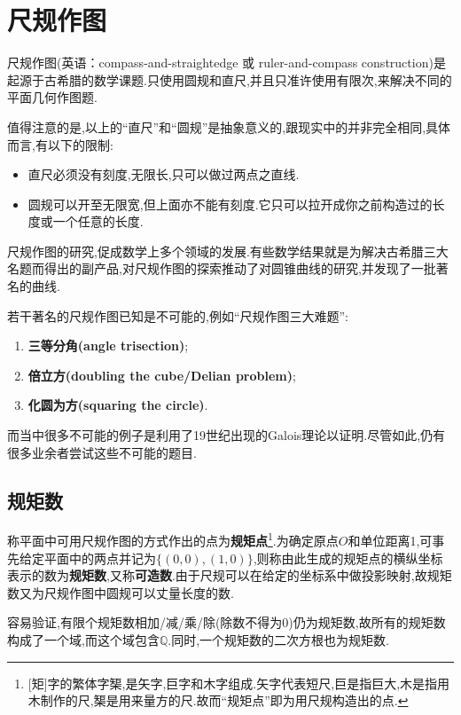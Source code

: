 \chapter{尺规作图}
尺规作图(英语：compass-and-straightedge 或 ruler-and-compass construction)是起源于古希腊的数学课题.只使用圆规和直尺,并且只准许使用有限次,来解决不同的平面几何作图题.

值得注意的是,以上的``直尺''和``圆规''是抽象意义的,跟现实中的并非完全相同,具体而言,有以下的限制:
\begin{itemize}
	\item 直尺必须没有刻度,无限长,只可以做过两点之直线.
	\item 圆规可以开至无限宽,但上面亦不能有刻度.它只可以拉开成你之前构造过的长度或一个任意的长度.
\end{itemize}

尺规作图的研究,促成数学上多个领域的发展.有些数学结果就是为解决古希腊三大名题而得出的副产品,对尺规作图的探索推动了对圆锥曲线的研究,并发现了一批著名的曲线.

若干著名的尺规作图已知是不可能的,例如``尺规作图三大难题'':
\begin{enumerate}
	\item \textbf{三等分角(angle trisection)};
	\item \textbf{倍立方(doubling the cube/Delian problem)};
	\item \textbf{化圆为方(squaring the circle)}.
\end{enumerate}

而当中很多不可能的例子是利用了19世纪出现的Galois理论以证明.尽管如此,仍有很多业余者尝试这些不可能的题目.
\section{规矩数}
\begin{definition}
	称平面中可用尺规作图的方式作出的点为\textbf{规矩点}\footnote{[矩]字的繁体字榘,是矢字,巨字和木字组成.矢字代表短尺,巨是指巨大,木是指用木制作的尺,榘是用来量方的尺.故而``规矩点''即为用尺规构造出的点.}.为确定原点$O$和单位距离1,可事先给定平面中的两点并记为$\{(0,0),(1,0)\}$,则称由此生成的规矩点的横纵坐标表示的数为\textbf{规矩数},又称\textbf{可造数}.由于尺规可以在给定的坐标系中做投影映射,故规矩数又为尺规作图中圆规可以丈量长度的数.
\end{definition}

容易验证,有限个规矩数相加/减/乘/除(除数不得为0)仍为规矩数,故所有的规矩数构成了一个域,而这个域包含$\mathbb{Q}$.同时,一个规矩数的二次方根也为规矩数.

